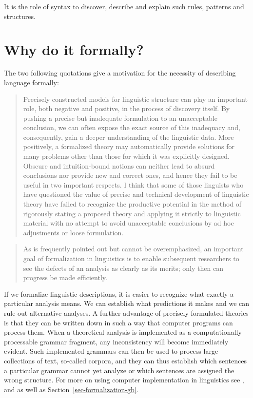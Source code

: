 It is the role of syntax to discover, describe and explain such rules, patterns and structures.

\section{Why do it formally?}
\label{sec-formal}

The two following quotations give a motivation for the necessity of
describing language formally:  
\begin{quote}
\label{quote-Chomsky-Formalisierung}%
Precisely constructed models for linguistic structure can play an
important role, both negative and positive, in the process of discovery 
itself. By pushing a precise but inadequate formulation to
an unacceptable conclusion, we can often expose the exact source
of this inadequacy and, consequently, gain a deeper understanding
of the linguistic data. More positively, a formalized theory may 
automatically provide solutions for many problems other than those
for which it was explicitly designed. Obscure and intuition-bound
notions can neither lead to absurd conclusions nor provide new and
correct ones, and hence they fail to be useful in two important respects. 
I think that some of those linguists who have questioned
the value of precise and technical development of linguistic theory
have failed to recognize the productive potential in the method
of rigorously stating a proposed theory and applying it strictly to
linguistic material with no attempt to avoid unacceptable conclusions 
by ad hoc adjustments or loose formulation.
\citep[]{Chomsky57a}
\end{quote}

\begin{quote}
As is frequently pointed out but cannot be overemphasized, an important goal
of formalization in linguistics is to enable subsequent researchers to see the defects
of an analysis as clearly as its merits; only then can progress be made efficiently.
\citep[]{Dowty79a}
\end{quote}
%
If we formalize linguistic descriptions, it is easier to recognize what exactly a particular analysis means. 
We can establish what predictions it makes and we can rule out alternative analyses. A further
advantage of precisely formulated theories is that they can be written down in such a way
that computer programs can process them. When a theoretical analysis is implemented as a computationally processable grammar fragment, 
any inconsistency will become immediately evident. Such implemented grammars can then be used to process
large collections of text, so-called corpora, and they can thus establish which
sentences a particular grammar cannot yet analyze or which sentences are assigned the wrong
structure. For more on using computer implementation in linguistics see ,
 and  as well as Section~\ref{sec-formalization-gb}.



